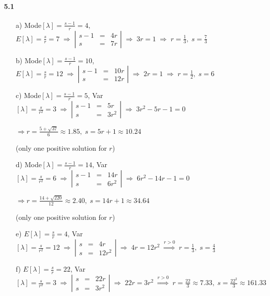 \documentclass[fontsize=11pt,DIV=18,parskip=half]{scrartcl}
\begin{document}
\paragraph{5.1}
\begin{enumerate}
\item[a)] Mode$[\lambda] = \frac{s-1}{r} = 4$, $E[\lambda] = \frac{s}{r} = 7 \; \Rightarrow \; \left|\begin{array}{lll}s-1 & = & 4r\\ s & = & 7r\end{array}\right| \; \Rightarrow \; 3r = 1 \; \Rightarrow \; r=\frac13, \; s= \frac73$
\item[b)] Mode$[\lambda] = \frac{s-1}{r} = 10$, $E[\lambda] = \frac{s}{r} = 12 \; \Rightarrow \; \left|\begin{array}{lll}s-1 & = & 10r\\ s & = & 12r\end{array}\right| \; \Rightarrow \; 2r = 1 \; \Rightarrow \; r=\frac12, \; s = 6$
\item[c)] Mode$[\lambda] = \frac{s-1}{r} = 5$, Var$[\lambda] = \frac{s}{r^2} = 3 \; \Rightarrow \; \left|\begin{array}{lll}s-1 & = & 5r\\ s & = & 3r^2\end{array}\right| \; \Rightarrow \; 3r^2-5r-1 = 0$

$\Rightarrow r = \frac{5+\sqrt{37}}{6} \approx 1.85, \; s= 5r+1 \approx 10.24$

(only one positive solution for $r$)

\item[d)] Mode$[\lambda] = \frac{s-1}{r} = 14$, Var$[\lambda] = \frac{s}{r^2} = 6 \; \Rightarrow \; \left|\begin{array}{lll}s-1 & = & 14r\\ s & = & 6r^2\end{array}\right| \; \Rightarrow \; 6r^2-14r-1 = 0$

$\Rightarrow r = \frac{14+\sqrt{220}}{12} \approx 2.40, \; s= 14r+1 \approx 34.64$

(only one positive solution for $r$)

\item[e)] $E[\lambda] = \frac{s}{r} = 4$, Var$[\lambda] = \frac{s}{r^2} = 12 \; \Rightarrow \; \left|\begin{array}{lll}s & = & 4r\\ s & = & 12r^2\end{array}\right| \; \Rightarrow \; 4r = 12r^2 \; \stackrel{r>0}{\Rightarrow}  \; r = \frac13,\; s=\frac43$

\item[f)] $E[\lambda] = \frac{s}{r} = 22$, Var$[\lambda] = \frac{s}{r^2} = 3 \; \Rightarrow \; \left|\begin{array}{lll}s & = & 22r\\ s & = & 3r^2\end{array}\right| \; \Rightarrow \; 22r = 3r^2 \; \stackrel{r>0}{\Rightarrow}  \; r = \frac{22}{3} \approx 7.33,\; s=\frac{22^2}{3} \approx 161.33$
\end{enumerate}
\end{document}
